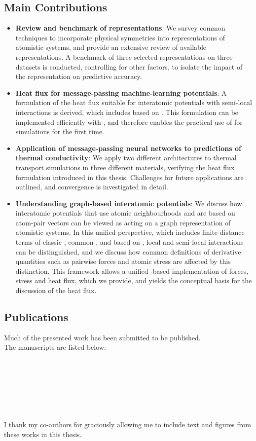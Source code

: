 \subsection{Main Contributions}
\begin{itemize}[itemsep=0pt,topsep=0.5\baselineskip]
  \item \textbf{Review and benchmark of representations}: We survey common techniques to incorporate physical symmetries into representations of atomistic systems, and provide an extensive review of available representations. A benchmark of three selected representations on three datasets is conducted, controlling for other factors, to isolate the impact of the representation on predictive accuracy.
  \item \textbf{Heat flux for message-passing machine-learning potentials}: A formulation of the heat flux suitable for interatomic potentials with semi-local interactions is derived, which includes \mlps based on \mpnns. This formulation can be implemented efficiently with \ad, and therefore enables the practical use of \mpnns for \gk simulations for the first time.
  \item \textbf{Application of message-passing neural networks to predictions of thermal conductivity}: We apply two different \mpnn architectures to thermal transport simulations in three different materials, verifying the heat flux formulation introduced in this thesis. Challenges for future applications are outlined, and convergence is investigated in detail.
  \item \textbf{Understanding graph-based interatomic potentials}: We discuss how interatomic potentials that use atomic neighbourhoods and are based on atom-pair vectors can be viewed as acting on a graph representation of atomistic systems. In this unified perspective, which includes finite-distance terms of classic \ffs, common \mlps, and \mlps based on \mpnns, local and semi-local interactions can be distinguished, and we discuss how common definitions of derivative quantities such as pairwise forces and atomic stress are affected by this distinction. This framework allows a unified \ad-based implementation of forces, stress and heat flux, which we provide, and yields the conceptual basis for the discussion of the heat flux.
\end{itemize}

\clearpage
\subsection{Publications}
Much of the presented work has been submitted to be published.\\
The manuscripts are listed below:
\\\\
\PaperReps
\\\\
\PaperHF
\\\\
\PaperGLP
\\\\
I thank my co-authors for graciously allowing me to include text and figures from these works in this thesis.
\vspace*{\fill}

